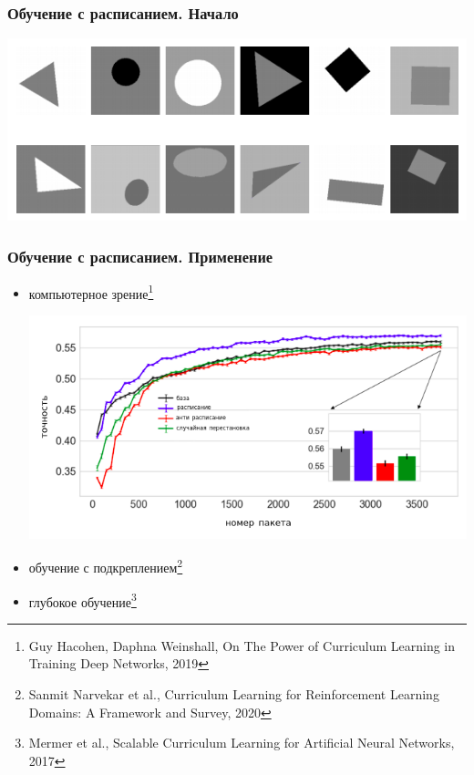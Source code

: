\documentclass{beamer}
\begin{document}
\begin{frame}
	\frametitle{Обучение с расписанием. Начало}
	
	\begin{center}
		\includegraphics[scale=0.5]{cl_geom_shapes}
	\end{center}
	
	\let\thefootnote\relax{}
\end{frame}

\begin{frame}
	\frametitle{Обучение с расписанием. Применение}
	\begin{itemize}
		\item компьютерное зрение\footnote[1]{Guy Hacohen, Daphna Weinshall, On The Power of Curriculum Learning in Training Deep Networks, 2019}

		\includegraphics[scale=0.4]{curriculum_learning_cv}
		
		\item обучение с подкреплением\footnote[2]{Sanmit Narvekar et al., Curriculum Learning for Reinforcement Learning Domains: A Framework and Survey, 2020}
		
		\item глубокое обучение\footnote[3]{Mermer et al., Scalable Curriculum Learning for Artificial Neural Networks, 2017}
	\end{itemize}
\end{frame}
\end{document}
